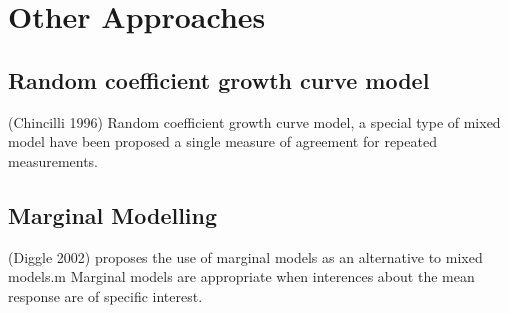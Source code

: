 \documentclass[12pt, a4paper]{report}
\theoremstyle{plain}
\theoremstyle{definition}
\theoremstyle{remark}
\begin{document}
\section{Other Approaches}

\subsection{Random coefficient growth curve model} (Chincilli
1996) Random coefficient growth curve model, a special type of
mixed model have been proposed  a single measure of agreement for
repeated measurements.
\subsection{Marginal Modelling}
(Diggle 2002) proposes the use of marginal models as an
alternative to mixed models.m Marginal models are appropriate when
interences about the mean response are of specific interest.







\end{document}
